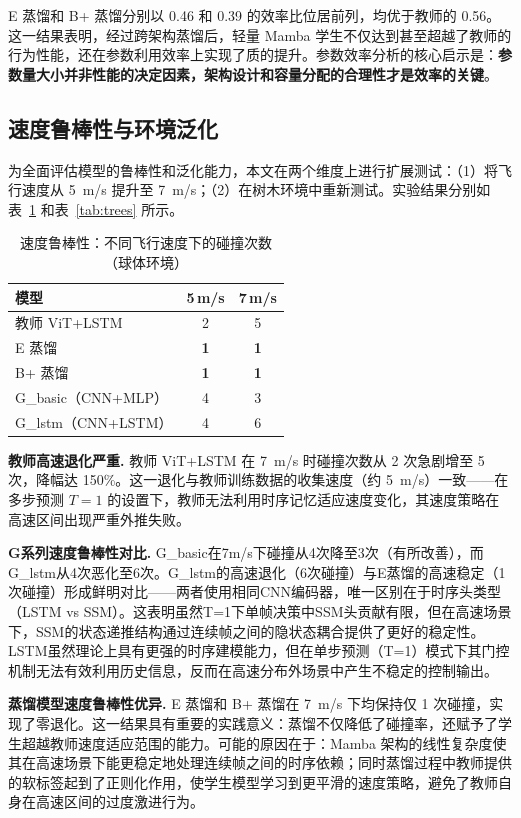 \documentclass[12pt,a4paper]{article}
\numberwithin{equation}{section}
\numberwithin{figure}{section}
\numberwithin{table}{section}
\begin{document}
E 蒸馏和 B+ 蒸馏分别以 0.46 和 0.39 的效率比位居前列，均优于教师的 0.56。这一结果表明，经过跨架构蒸馏后，轻量 Mamba 学生不仅达到甚至超越了教师的行为性能，还在参数利用效率上实现了质的提升。参数效率分析的核心启示是：\textbf{参数量大小并非性能的决定因素，架构设计和容量分配的合理性才是效率的关键}。

\subsection{速度鲁棒性与环境泛化}
\label{sec:velocity-generalization}

为全面评估模型的鲁棒性和泛化能力，本文在两个维度上进行扩展测试：（1）将飞行速度从 5~m/s 提升至 7~m/s；（2）在树木环境中重新测试。实验结果分别如表~\ref{tab:velocity} 和表~\ref{tab:trees} 所示。

\begin{table}[H]
\centering
\caption{速度鲁棒性：不同飞行速度下的碰撞次数（球体环境）}
\label{tab:velocity}
\begin{tabular}{lcc}
\toprule
模型 & 5\,m/s & 7\,m/s \\
\midrule
教师 ViT+LSTM & 2 & 5 \\
E 蒸馏 & \textbf{1} & \textbf{1} \\
B+ 蒸馏 & \textbf{1} & \textbf{1} \\
G\_basic（CNN+MLP） & 4 & 3 \\
G\_lstm（CNN+LSTM） & 4 & 6 \\
\bottomrule
\end{tabular}
\end{table}

\textbf{教师高速退化严重.} 教师 ViT+LSTM 在 7~m/s 时碰撞次数从 2 次急剧增至 5 次，降幅达 150\%。这一退化与教师训练数据的收集速度（约 5~m/s）一致——在多步预测 $T=1$ 的设置下，教师无法利用时序记忆适应速度变化，其速度策略在高速区间出现严重外推失败。

\textbf{G系列速度鲁棒性对比.} G\_basic在7m/s下碰撞从4次降至3次（有所改善），而G\_lstm从4次恶化至6次。G\_lstm的高速退化（6次碰撞）与E蒸馏的高速稳定（1次碰撞）形成鲜明对比——两者使用相同CNN编码器，唯一区别在于时序头类型（LSTM vs SSM）。这表明虽然T=1下单帧决策中SSM头贡献有限，但在高速场景下，SSM的状态递推结构通过连续帧之间的隐状态耦合提供了更好的稳定性。LSTM虽然理论上具有更强的时序建模能力，但在单步预测（T=1）模式下其门控机制无法有效利用历史信息，反而在高速分布外场景中产生不稳定的控制输出。

\textbf{蒸馏模型速度鲁棒性优异.} E 蒸馏和 B+ 蒸馏在 7~m/s 下均保持仅 1 次碰撞，实现了零退化。这一结果具有重要的实践意义：蒸馏不仅降低了碰撞率，还赋予了学生超越教师速度适应范围的能力。可能的原因在于：Mamba 架构的线性复杂度使其在高速场景下能更稳定地处理连续帧之间的时序依赖；同时蒸馏过程中教师提供的软标签起到了正则化作用，使学生模型学习到更平滑的速度策略，避免了教师自身在高速区间的过度激进行为。
\end{document}
